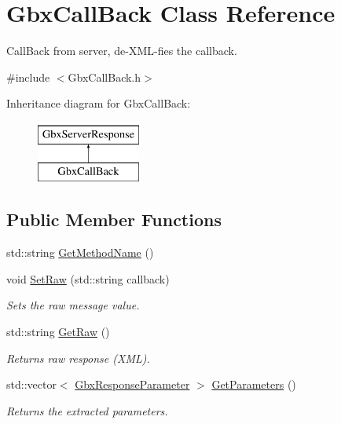 \hypertarget{classGbxCallBack}{\section{Gbx\-Call\-Back Class Reference}
\label{classGbxCallBack}
}


Call\-Back from server, de-\/\-X\-M\-L-\/fies the callback.  




{\ttfamily \#include $<$Gbx\-Call\-Back.\-h$>$}

Inheritance diagram for Gbx\-Call\-Back\-:\begin{figure}[H]
\begin{center}
\leavevmode
\includegraphics[height=2.000000cm]{classGbxCallBack}
\end{center}
\end{figure}
\subsection*{Public Member Functions}
\begin{DoxyCompactItemize}
\item 
std\-::string \hyperlink{classGbxCallBack_aaf01544527ca0559478221780b3f32f6}{Get\-Method\-Name} ()
\item 
void \hyperlink{classGbxCallBack_a9382de8d43cae9e7a9acd384146c2900}{Set\-Raw} (std\-::string callback)
\begin{DoxyCompactList}\small\item\em Sets the raw message value. \end{DoxyCompactList}\item 
\hypertarget{classGbxServerResponse_aa449d9a63899e1d1205e6ab916798ba6}{std\-::string \hyperlink{classGbxServerResponse_aa449d9a63899e1d1205e6ab916798ba6}{Get\-Raw} ()}\label{classGbxServerResponse_aa449d9a63899e1d1205e6ab916798ba6}

\begin{DoxyCompactList}\small\item\em Returns raw response (X\-M\-L). \end{DoxyCompactList}\item 
\hypertarget{classGbxServerResponse_a6d42bdaaeff3368e1fab2984940d2a2c}{std\-::vector$<$ \hyperlink{classGbxResponseParameter}{Gbx\-Response\-Parameter} $>$ \hyperlink{classGbxServerResponse_a6d42bdaaeff3368e1fab2984940d2a2c}{Get\-Parameters} ()}\label{classGbxServerResponse_a6d42bdaaeff3368e1fab2984940d2a2c}

\begin{DoxyCompactList}\small\item\em Returns the extracted parameters. \end{DoxyCompactList}\end{DoxyCompactItemize}
